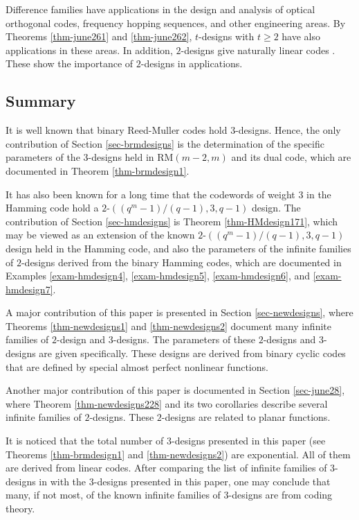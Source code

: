 \documentclass[1p,final]{elsarticle}
\newcommand{\RM}{{\mathrm{RM}}}
\begin{document}
Difference families have applications in the design and analysis of optical orthogonal codes, 
frequency hopping sequences, and other engineering areas. By Theorems \ref{thm-june261} and 
\ref{thm-june262}, $t$-designs with $t \geq 2$ have also applications in these areas. In addition, 
$2$-designs give naturally linear codes \cite{AK92,DingBook}. These show the importance of 
$2$-designs in applications.     

\subsection{Summary} 

It is well known that binary Reed-Muller codes hold $3$-designs. Hence, the only contribution 
of Section \ref{sec-brmdesigns} is the determination of the specific parameters of the $3$-designs 
held in $\RM(m-2, m)$ and its dual code, which are documented in Theorem \ref{thm-brmdesign1}. 

It has also been known for a long time that the codewords of weight $3$ in the Hamming code 
hold a $2$-$((q^m-1)/(q-1), 3, q-1)$ design. The contribution of Section \ref{sec-hmdesigns} 
is Theorem \ref{thm-HMdesign171}, which may be viewed as an extension of the known 
$2$-$((q^m-1)/(q-1), 3, q-1)$ design held in the Hamming code, and also the parameters 
of the infinite families of $2$-designs derived from the binary Hamming codes, which are 
documented in Examples \ref{exam-hmdesign4}, \ref{exam-hmdesign5}, \ref{exam-hmdesign6}, 
and \ref{exam-hmdesign7}. 

A major contribution of this paper is presented in Section \ref{sec-newdesigns}, where 
Theorems \ref{thm-newdesigns1} and \ref{thm-newdesigns2} document many infinite families of 
$2$-design and $3$-designs. The parameters of these $2$-designs and $3$-designs are given 
specifically. These designs are derived from binary cyclic codes that are defined by special 
almost perfect nonlinear functions.   

Another major contribution of this paper is documented in Section \ref{sec-june28}, 
where Theorem \ref{thm-newdesigns228} and its two corollaries describe several infinite 
families of $2$-designs. These $2$-designs are related to planar functions.    

It is noticed that the total number of $3$-designs presented in this paper (see Theorems  
\ref{thm-brmdesign1} and \ref{thm-newdesigns2}) are exponential. All of them are derived from linear 
codes. After comparing the list of infinite families of $3$-designs in \cite{KLhb} with the $3$-designs 
presented in this paper, one may conclude that many, if not most, of the known infinite families of $3$-designs 
are from coding theory.    
\end{document}
